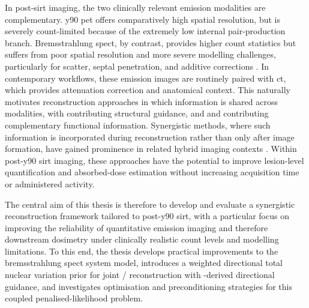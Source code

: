 In post-\gls{sirt} imaging, the two clinically relevant emission modalities are complementary. \gls{y90} \acrfull{pet} offers comparatively high spatial resolution, but is severely count-limited because of the extremely low internal pair-production branch. Bremsstrahlung \acrfull{spect}, by contrast, provides higher count statistics but suffers from poor spatial resolution and more severe modelling challenges, particularly for scatter, septal penetration, and additive corrections \cite{kappadath_quantitative_2024}. In contemporary workflows, these emission images are routinely paired with \acrfull{ct}, which provides attenuation correction and anatomical context. This naturally motivates reconstruction approaches in which information is shared across modalities, with  contributing structural guidance, and  and  contributing complementary functional information. Synergistic methods, where such information is incorporated during reconstruction rather than only after image formation, have gained prominence in related hybrid imaging contexts \cite{arridge_overview_2021}. Within post-\gls{y90} \gls{sirt} imaging, these approaches have the potential to improve lesion-level quantification and absorbed-dose estimation without increasing acquisition time or administered activity.

The central aim of this thesis is therefore to develop and evaluate a synergistic reconstruction framework tailored to post-\gls{y90} \gls{sirt}, with a particular focus on improving the reliability of quantitative emission imaging and therefore downstream dosimetry under clinically realistic count levels and modelling limitations. To this end, the thesis develops practical improvements to the bremsstrahlung \gls{spect} system model, introduces a weighted directional total nuclear variation prior for joint / reconstruction with -derived directional guidance, and investigates optimisation and preconditioning strategies for this coupled penalised-likelihood problem.

